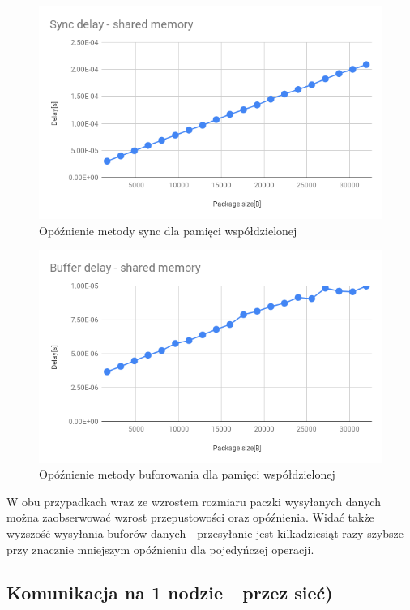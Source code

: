 \documentclass[11pt]{article}
\begin{document}
    \begin{figure}[H]
        \includegraphics[width=1\textwidth,frame]{charts/Sync-delay-shared-memory.png}
        \caption{Opóźnienie metody sync dla pamięci współdzielonej}
        \label{fig:sync-shared-delay}
    \end{figure}
    \begin{figure}[H]
        \includegraphics[width=1\textwidth,frame]{charts/Buffer delay - shared memory.png}
        \caption{Opóźnienie metody buforowania dla pamięci współdzielonej}
        \label{fig:buff-shared-delay}
    \end{figure}

    W obu przypadkach wraz ze wzrostem rozmiaru paczki wysyłanych danych można zaobserwować wzrost
    przepustowości oraz opóźnienia.
    Widać także wyższość wysyłania buforów danych---przesyłanie jest kilkadziesiąt razy szybsze przy znacznie mniejszym
    opóźnieniu dla pojedyńczej operacji.

    \subsection{Komunikacja na 1 nodzie---przez sieć)}
\end{document}
